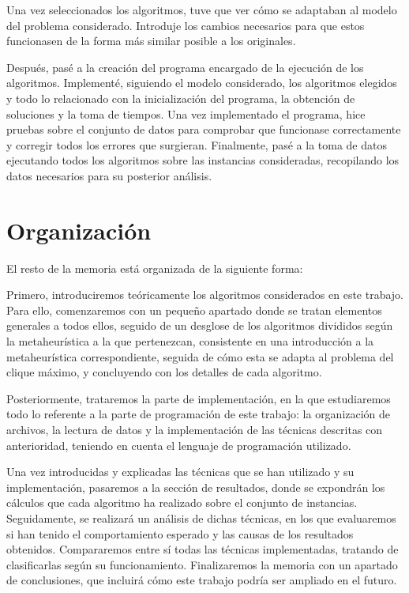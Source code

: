 Una vez seleccionados los algoritmos, tuve que ver cómo se adaptaban al modelo
del problema considerado. Introduje los cambios necesarios para que estos funcionasen
de la forma más similar posible a los originales.

Después, pasé a la creación del programa encargado de la ejecución de los algoritmos.
Implementé, siguiendo el modelo considerado, los algoritmos elegidos y todo lo relacionado
con la inicialización del programa, la obtención de soluciones y la toma de tiempos.
Una vez implementado el programa, hice pruebas sobre el conjunto de datos para comprobar
que funcionase correctamente y corregir todos los errores que surgieran. Finalmente,
pasé a la toma de datos ejecutando todos los algoritmos sobre las instancias consideradas,
recopilando los datos necesarios para su posterior análisis.


\section{Organización}

El resto de la memoria está organizada de la siguiente forma:

Primero, introduciremos teóricamente los algoritmos considerados en este trabajo.
Para ello, comenzaremos con un pequeño apartado donde se tratan elementos generales a
todos ellos, seguido de un desglose de los algoritmos divididos según la metaheurística
a la que pertenezcan, consistente en una introducción a la metaheurística correspondiente,
seguida de cómo esta se adapta al problema del clique máximo, y concluyendo con los
detalles de cada algoritmo.

Posteriormente, trataremos la parte de implementación, en la que estudiaremos todo lo
referente a la parte de programación de este trabajo: la organización de archivos,
la lectura de datos y la implementación de las técnicas descritas con anterioridad,
teniendo en cuenta el lenguaje de programación utilizado.

Una vez introducidas y explicadas las técnicas que se han utilizado y su implementación,
pasaremos a la sección de resultados, donde se expondrán los cálculos que cada algoritmo
ha realizado sobre el conjunto de instancias. Seguidamente, se realizará un análisis
de dichas técnicas, en los que evaluaremos si han tenido el comportamiento esperado y
las causas de los resultados obtenidos. Compararemos entre sí todas las técnicas
implementadas, tratando de clasificarlas según su funcionamiento. Finalizaremos la
memoria con un apartado de conclusiones, que incluirá cómo este trabajo podría ser
ampliado en el futuro.

